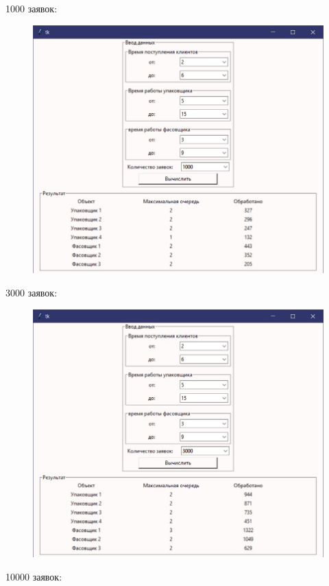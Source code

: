 \documentclass[16pt]{report}
\begin{document}
\newpage
{\Large1000 заявок:}
\begin{figure}[h]
	\centering
	\includegraphics[scale=0.8]{3.jpg}
	\label{fig:screenshot001}
\end{figure}
\newpage
{\Large3000 заявок:}
\begin{figure}[h]
	\centering
	\includegraphics[scale=0.8]{4.jpg}
	\label{fig:screenshot001}
\end{figure}
\newpage
{\Large10000 заявок:}
\end{document}
